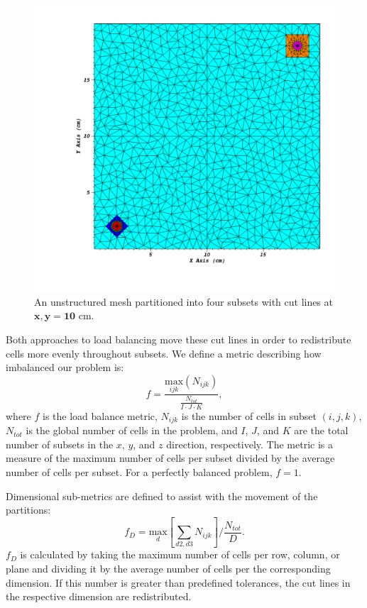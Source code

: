 \documentclass[letterpaper]{mandc2019}
\begin{document}
\begin{figure}[htb]
\centering
\includegraphics[scale=0.9,trim={0.95in 0.64in 0.35in 0.44in},clip]{Figures/partitioning_example.pdf}
\caption{An unstructured mesh partitioned into four subsets with cut lines at $\bm{x,y = 10}$ cm.}
\label{partitioning_example}
\end{figure}
Both approaches to load balancing move these cut lines in order to redistribute cells more evenly throughout subsets. We define a metric describing how imbalanced our problem is:
\begin{equation}
f =\frac{\underset{ijk}{\text{max}}(N_{ijk})}{\frac{N_{tot}}{I\cdot J\cdot K}},
\label{metric_def}
\end{equation}
where $f$ is the load balance metric, $N_{ijk}$ is the number of cells in subset $(i,j,k)$, $N_{tot}$ is the global number of cells in the problem, and $I$, $J$, and $K$ are the total number of subsets in the $x$, $y$, and $z$ direction, respectively. The metric is a measure of the maximum number of cells per subset divided by the average number of cells per subset. For a perfectly balanced problem, $f = 1$.

Dimensional sub-metrics are defined to assist with the movement of the partitions:
\begin{equation}
f_{D} = \underset{d}{\text{max}}[\sum_{d2,d3} N_{ijk}]/\frac{N_{tot}}{D}.
\label{f_d}
\end{equation}
$f_{D}$ is calculated by taking the maximum number of cells per row, column, or plane and dividing it by the average number of cells per the corresponding dimension. If this number is greater than predefined tolerances, the cut lines in the respective dimension are redistributed. 
\end{document}

